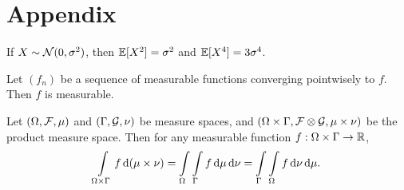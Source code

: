 \chapter*{Appendix}
\renewcommand\thetheorem{A.\arabic{theorem}}


\begin{lemma}
  If $X\sim\mathcal{N}(0,\sigma^2)$, then $\mathbb{E}[X^2] = \sigma^2$ and $\mathbb{E}[X^4] = 3\sigma^4$.
\end{lemma}



\begin{theorem}
  \label{theorem:pointwise-limit-of-measurable-functions-is-measurable}
  Let $(f_n)$ be a sequence of measurable functions converging pointwisely to $f$. Then $f$ is measurable.
\end{theorem}


\begin{theorem}
  \label{theorem:fubini}
  Let $(\Omega,\mathcal{F},\mu)$ and $(\Gamma,\mathcal{G},\nu)$ be measure spaces, and $(\Omega\times\Gamma,\mathcal{F}\otimes\mathcal{G},\mu\times\nu)$ be the product measure space. Then for any measurable function $f:\Omega\times\Gamma\to\mathbb{R}$,
  \begin{equation}  \int\limits_{\Omega\times\Gamma}f\,\mathrm{d} (\mu\times\nu) = \int\limits_{\Omega}\int\limits_{\Gamma}f\,\mathrm{d} \mu\,\mathrm{d} \nu = \int\limits_{\Gamma}\int\limits_{\Omega}f\,\mathrm{d} \nu\,\mathrm{d} \mu.
  \end{equation}
\end{theorem}

